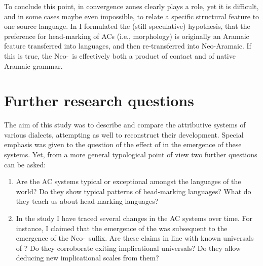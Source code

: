 To conclude this point, in convergence zones  clearly plays a role, yet it is difficult, and in some cases maybe even impossible, to relate a specific structural feature to one source language. In  I formulated the (still speculative) hypothesis, that the preference for head-marking of ACs (i.e., \cst* morphology) is originally an Aramaic  feature transferred into  languages, and then re-transferred into Neo-Aramaic. If this is true, the Neo-\cst\ is effectively both a product of contact and of native Aramaic grammar.

\section{Further research questions} \label{ss:futher}

The aim of this study was to describe and compare the attributive systems of various  dialects, attempting as well to reconstruct their development. Special emphasis was given to the question of the effect of  in the emergence of these systems. Yet, from a more general typological point of view two further questions can be asked:

\begin{enumerate}
	\item Are the  AC systems typical or exceptional amongst the languages of the world? Do they show typical patterns of head-marking languages? What do they teach us about head-marking languages?
	
	\item In the study I have traced several changes in the AC systems over time. For instance, I claimed that the emergence of the  was subsequent to the emergence of the Neo-\cst\ suffix. Are these claims in line with known universals of ? Do they corroborate exiting implicational universals? Do they allow deducing new implicational scales from them?
	
\end{enumerate}

